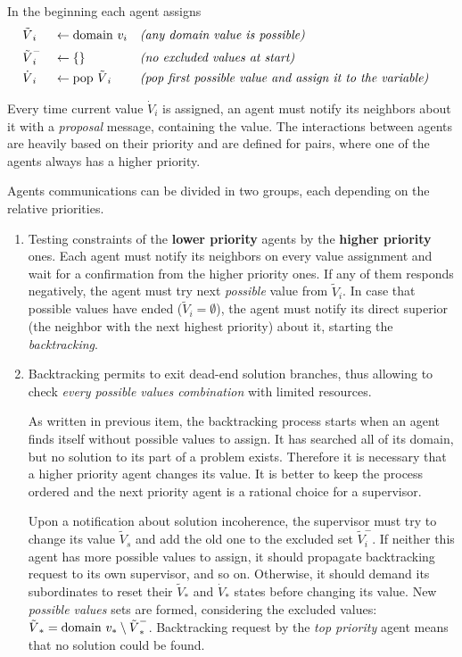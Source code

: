 \documentclass[ThesisDoc]{subfiles}
\begin{document}
\noindent
In the beginning each agent assigns
\begin{align*}
  &{\tilde V}_i   &&\leftarrow \mathrm{domain}~v_i       && \textit{(any domain value is possible)} & \\
  &{\tilde V}_i^- &&\leftarrow \{\}              && \textit{(no excluded values at start)}  &\\
  &{\dot V}_i     &&\leftarrow \mathrm{pop}~{\tilde V}_i && \textit{(pop first possible value and assign it to the variable)} &\\
\end{align*}

Every time current value ${\dot V}_i$ is assigned, an agent must notify its
neighbors about it with a \emph{proposal} message, containing the value.
The interactions between agents are heavily based on their priority and are
defined for pairs, where one of the agents always has a higher priority.

Agents communications can be divided in two groups, each depending on the relative
priorities.
\begin{enumerate}
  \item Testing constraints of the \textbf{lower priority} agents by the
    \textbf{higher priority} ones.
    Each agent must notify its neighbors on every value assignment and wait
    for a confirmation from the higher priority ones. If any of them responds
    negatively, the agent must try next \emph{possible} value from ${\tilde V}_i$.
    In case that possible values have ended (${\tilde V}_i = \emptyset$), the agent
    must notify its direct superior (the neighbor with the next highest priority)
    about it, starting the \emph{backtracking}.
  \item Backtracking permits to exit dead-end solution branches, thus allowing
    to check \emph{every possible values combination} with limited resources.

    As written in previous item, the backtracking process starts when an agent
    finds itself without possible values to assign. It has searched all of its
    domain, but no solution to its part of a problem exists. Therefore it is
    necessary that a higher priority agent changes its value. It is better to
    keep the process ordered and the next priority agent is a rational choice
    for a supervisor.

    Upon a notification about solution incoherence, the supervisor
    must try to change its value ${\tilde V}_s$ and add the old one to the
    excluded set ${\tilde V}_i^-$.
    If neither this agent has more possible values to assign, it should propagate
    backtracking request to its own supervisor, and so on. Otherwise, it should
    demand its subordinates to reset their ${\tilde V}_*$ and ${\dot V}_*$ states
    before changing its value. New \emph{possible values} sets are formed, considering
    the excluded values: ${\tilde V}_* = \mathrm{domain}~v_* \setminus {\tilde V}_*^-$.
    Backtracking request by the \emph{top priority} agent means that no solution
    could be found.
\end{enumerate}
\end{document}
